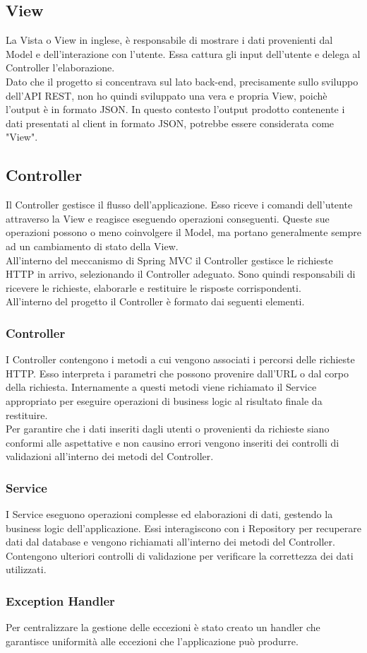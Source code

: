 \subsection{View}
La Vista o View in inglese, è responsabile di mostrare i dati provenienti dal Model e dell'interazione con l'utente. Essa cattura gli input dell'utente e delega al Controller l'elaborazione.\\
Dato che il progetto si concentrava sul lato back-end, precisamente sullo sviluppo dell'API REST, non ho quindi sviluppato una vera e propria View, poichè l'output è in formato JSON. In questo contesto l'output prodotto contenente i dati presentati al client in formato JSON, potrebbe essere considerata come "View".\\

\subsection{Controller}
Il Controller gestisce il flusso dell'applicazione. Esso riceve i comandi dell'utente attraverso la View e reagisce eseguendo operazioni conseguenti. Queste sue operazioni possono o meno coinvolgere il Model, ma portano generalmente sempre ad un cambiamento di stato della View.\\
All'interno del meccanismo di Spring MVC il Controller gestisce le richieste HTTP in arrivo, selezionando il Controller adeguato. Sono quindi responsabili di ricevere le richieste, elaborarle e restituire le risposte corrispondenti.\\
All'interno del progetto il Controller è formato dai seguenti elementi.
\subsubsection*{Controller}
I Controller contengono i metodi a cui vengono associati i percorsi delle richieste HTTP. Esso interpreta i parametri che possono provenire dall'URL o dal corpo della richiesta. Internamente a questi metodi viene richiamato il Service appropriato per eseguire operazioni di business logic al risultato finale da restituire.\\
Per garantire che i dati inseriti dagli utenti o provenienti da richieste siano conformi alle aspettative e non causino errori vengono inseriti dei controlli di validazioni all'interno dei metodi del Controller.
\subsubsection*{Service}
I Service eseguono operazioni complesse ed elaborazioni di dati, gestendo la business logic dell'applicazione. Essi interagiscono con i Repository per recuperare dati dal database e vengono richiamati all'interno dei metodi del Controller. Contengono ulteriori controlli di validazione per verificare la correttezza dei dati utilizzati.
\subsubsection*{Exception Handler}
Per centralizzare la gestione delle eccezioni è stato creato un handler che garantisce uniformità alle eccezioni che l'applicazione può produrre.\\
